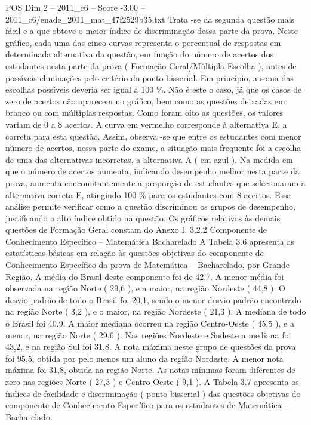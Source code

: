 \begin{textsample}{POS Dim 2 – 2011\_c6 – Score -3.00 – 2011\_c6/enade\_2011\_mat\_47f2529b35.txt}
Trata -se da segunda questão mais fácil e a que obteve o maior índice de discriminação dessa parte da prova.
Neste gráfico, cada uma das cinco curvas representa o percentual de respostas em determinada alternativa da questão, em função do número de acertos dos estudantes nesta parte da prova ( Formação Geral/Múltipla Escolha ), antes de possíveis eliminações pelo critério do ponto bisserial.
Em princípio, a soma das escolhas possíveis deveria ser igual a 100 \%.
Não é este o caso, já que os casos de zero de acertos não aparecem no gráfico, bem como as questões deixadas em branco ou com múltiplas respostas.
Como foram oito as questões, os valores variam de 0 a 8 acertos.
A curva em vermelho corresponde à alternativa E, a correta para esta questão.
Assim, observa -se que entre os estudantes com menor número de acertos, nessa parte do exame, a situação mais frequente foi a escolha de uma das alternativas incorretas, a alternativa A ( em azul ).
Na medida em que o número de acertos aumenta, indicando desempenho melhor nesta parte da prova, aumenta concomitantemente a proporção de estudantes que selecionaram a alternativa correta E, atingindo 100 \% para os estudantes com 8 acertos.
Essa análise permite verificar como a questão discriminou os grupos de desempenho, justificando o alto índice obtido na questão.
Os gráficos relativos às demais questões de Formação Geral constam do Anexo I. 3.2.2 Componente de Conhecimento Específico – Matemática Bacharelado A Tabela 3.6 apresenta as estatísticas básicas em relação às questões objetivas do componente de Conhecimento Específico da prova de Matemática – Bacharelado, por Grande Região.
A média do Brasil deste componente foi de 42,7.
A menor média foi observada na região Norte ( 29,6 ), e a maior, na região Nordeste ( 44,8 ).
O desvio padrão de todo o Brasil foi 20,1, sendo o menor desvio padrão encontrado na região Norte ( 3,2 ), e o maior, na região Nordeste ( 21,3 ).
A mediana de todo o Brasil foi 40,9.
A maior mediana ocorreu na região Centro-Oeste ( 45,5 ), e a menor, na região Norte ( 29,6 ).
Nas regiões Nordeste e Sudeste a mediana foi 43,2, e na região Sul foi 31,8.
A nota máxima neste grupo de questões da prova foi 95,5, obtida por pelo menos um aluno da região Nordeste.
A menor nota máxima foi 31,8, obtida na região Norte.
As notas mínimas foram diferentes de zero nas regiões Norte ( 27,3 ) e Centro-Oeste ( 9,1 ).
A Tabela 3.7 apresenta os índices de facilidade e discriminação ( ponto bisserial ) das questões objetivas do componente de Conhecimento Específico para os estudantes de Matemática – Bacharelado.

\end{textsample}
